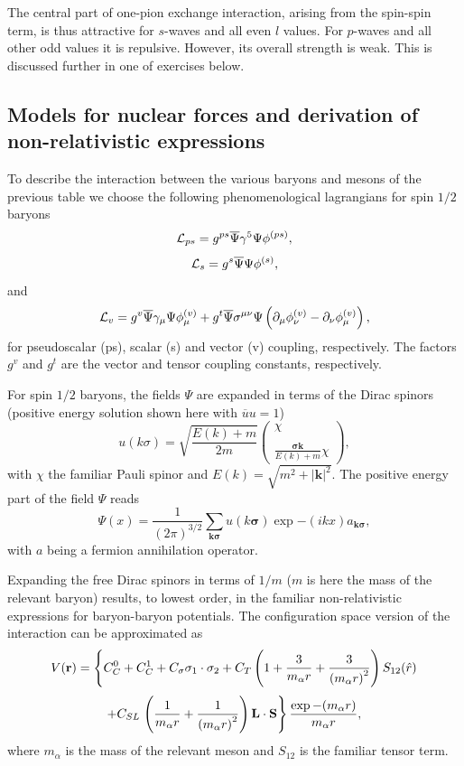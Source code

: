 \documentclass[%
oneside,                 %
final,                   %
10pt]{article}
\begin{document}
The central part of one-pion exchange interaction, arising from the spin-spin term,  
is thus attractive for $s$-waves and all even $l$ values. For $p$-waves and all other odd values
it is repulsive. However, its overall strength is weak. This is discussed further in one of exercises below.


\subsection*{Models for nuclear forces and derivation of non-relativistic expressions}
To describe the interaction between the various baryons and mesons of the previous
table we choose the following phenomenological
lagrangians
for spin $1/2$ baryons
\[
   {\cal L}_{ps} =g^{ps}\overline{\Psi}\gamma^{5}
   \Psi\phi^{(ps)},
\]
\[
   {\cal L}_{s} =g^{s}\overline{\Psi}\Psi\phi^{(s)},
\]
and
\[
   {\cal L}_{v} =g^{v}\overline{\Psi}\gamma_{\mu}\Psi\phi_{\mu}^{(v)}
   +g^{t}\overline{\Psi}\sigma^{\mu\nu}\Psi\left
   (\partial_{\mu}\phi_{\nu}^{(v)}
   -\partial_{\nu}\phi_{\mu}^{(v)}\right),
\]
for pseudoscalar (ps), scalar (s) and vector (v) coupling, respectively.
The factors $g^{v}$ and $g^{t}$ are the vector
and tensor coupling constants, respectively.

For spin $1/2$ baryons, the fields $\Psi$ are expanded
in terms of the Dirac spinors (positive energy
solution shown here with $\overline{u}u=1$)
\[
   u(k\sigma)=\sqrt{\frac{E(k)+m}{2m}}
	  \left(\begin{array}{c} \chi\\ \\
	  \frac{\mathbf{\sigma}\mathbf{k}}{E(k)+m}\chi
	  \end{array}\right), 
\]
with $\chi$ the familiar Pauli spinor and $E(k) =\sqrt{m^2 +|\mathbf{k}|^2}$. 
The positive energy part of the field $\Psi$ reads
\[
\Psi (x)={\displaystyle \frac{1}{(2\pi )^{3/2}}
        \sum_{\mathbf{k}\mathbf{\sigma}}u(k\mathbf{\sigma})\exp{-(ikx)}a_{\mathbf{k}\mathbf{\sigma}}},
\]
with $a$ being a fermion annihilation operator.

Expanding the free Dirac spinors
in terms of $1/m$ ($m$ is here the mass of the relevant baryon) 
results, to lowest order, in the familiar non-relativistic
expressions for baryon-baryon potentials.
The configuration space version of the interaction can be approximated as
\[
V(\mathbf{r})= \left\{ C^0_C + C^1_C + C_\sigma 
\mathbf{\sigma}_1\cdot\mathbf{\sigma}_2
 + C_T \left( 1 + {3\over m_\alpha r} + {3\over
\left(m_\alpha r\right)^2}
\right) S_{12} (\hat r)\right.
\]
\[
+ C_{SL}\left. \left( {1\over m_\alpha r} + {1\over \left( m_\alpha r\right)^2}
\right) \mathbf{L}\cdot \mathbf{S}
\right\} \frac{\exp{-(m_\alpha r)}}{m_\alpha r},
\]
where $m_{\alpha}$ is the mass of the relevant meson and
$S_{12}$ is the familiar tensor term.
\end{document}
